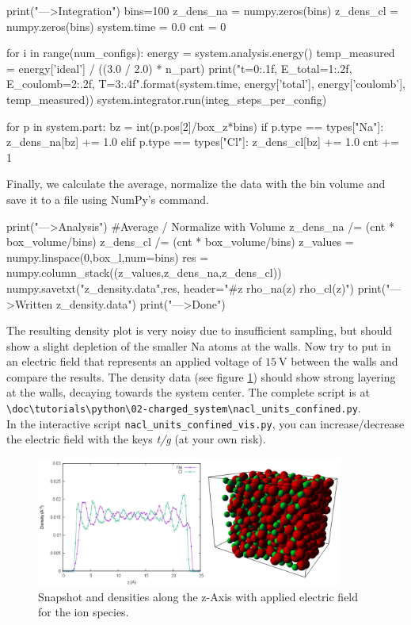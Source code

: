 \documentclass[
a4paper,                        %
11pt,                           %
twoside,                        %
footsepline,                    %
headsepline,                    %
headexclude,                    %
footexclude,                    %
pagesize,                       %
]{scrartcl}
\begin{document}
\begin{pypresso}
print("\n--->Integration")
bins=100
z_dens_na = numpy.zeros(bins)
z_dens_cl = numpy.zeros(bins)
system.time = 0.0
cnt = 0

for i in range(num_configs):
    energy = system.analysis.energy()
    temp_measured = energy['ideal'] / ((3.0 / 2.0) * n_part)
    print("t={0:.1f}, E_total={1:.2f}, E_coulomb={2:.2f},
          T={3:.4f}".format(system.time, energy['total'],
          energy['coulomb'], temp_measured))
    system.integrator.run(integ_steps_per_config)

    for p in system.part:
        bz = int(p.pos[2]/box_z*bins)
        if p.type == types["Na"]:
            z_dens_na[bz] += 1.0
        elif p.type == types["Cl"]:
            z_dens_cl[bz] += 1.0
    cnt += 1
\end{pypresso}

Finally, we calculate the average, normalize the data with the bin volume and save it to
a file using NumPy's  command.

\begin{pypresso}
print("\n--->Analysis")
#Average / Normalize with Volume
z_dens_na /= (cnt * box_volume/bins)
z_dens_cl /= (cnt * box_volume/bins)
z_values = numpy.linspace(0,box_l,num=bins)
res = numpy.column_stack((z_values,z_dens_na,z_dens_cl))
numpy.savetxt("z_density.data",res,
        header="#z rho_na(z) rho_cl(z)")
print("\n--->Written z_density.data")
print("\n--->Done")
\end{pypresso}

The resulting density plot is very noisy due to insufficient sampling, but should show a slight depletion of the smaller Na atoms
at the walls. Now try to put in an electric field that represents an applied voltage of $15 \ \mathrm{V}$ between the walls and compare the results.
The density data (see figure \ref{fig:nacl_confined}) should show strong layering at the walls, decaying towards the system center.
The complete script is at \\
\verb|\doc\tutorials\python\02-charged_system\nacl_units_confined.py|.\\
In the interactive script \verb|nacl_units_confined_vis.py|, you can increase/decrease the electric field with the keys \emph{t/g} (at your own risk).

\begin{figure}[tb]
  \centering
  \includegraphics[width=0.9\textwidth]{figures/nacl_units_confined}
  \caption{Snapshot and densities along the z-Axis with applied electric field for the ion species.}
  \label{fig:nacl_confined}
\end{figure}
\end{document}
